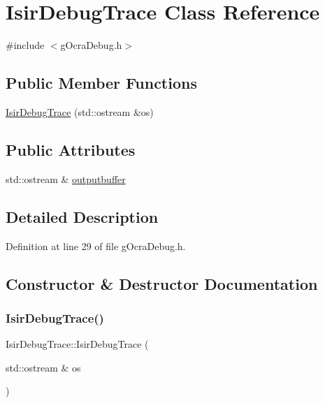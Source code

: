 \hypertarget{classIsirDebugTrace}{}\section{Isir\+Debug\+Trace Class Reference}
\label{classIsirDebugTrace}


{\ttfamily \#include $<$g\+Ocra\+Debug.\+h$>$}

\subsection*{Public Member Functions}
\begin{DoxyCompactItemize}
\item 
\hyperlink{classIsirDebugTrace_ab4825d51a9b268b65d8807d42035f16d}{Isir\+Debug\+Trace} (std\+::ostream \&os)
\end{DoxyCompactItemize}
\subsection*{Public Attributes}
\begin{DoxyCompactItemize}
\item 
std\+::ostream \& \hyperlink{classIsirDebugTrace_aede1e58ef880d19d0203086232a6dd99}{outputbuffer}
\end{DoxyCompactItemize}


\subsection{Detailed Description}


Definition at line 29 of file g\+Ocra\+Debug.\+h.



\subsection{Constructor \& Destructor Documentation}
\hypertarget{classIsirDebugTrace_ab4825d51a9b268b65d8807d42035f16d}{}\label{classIsirDebugTrace_ab4825d51a9b268b65d8807d42035f16d} 
\subsubsection{\texorpdfstring{Isir\+Debug\+Trace()}{IsirDebugTrace()}}
{\footnotesize\ttfamily Isir\+Debug\+Trace\+::\+Isir\+Debug\+Trace (\begin{DoxyParamCaption}\item[{std\+::ostream \&}]{os }\end{DoxyParamCaption})}



